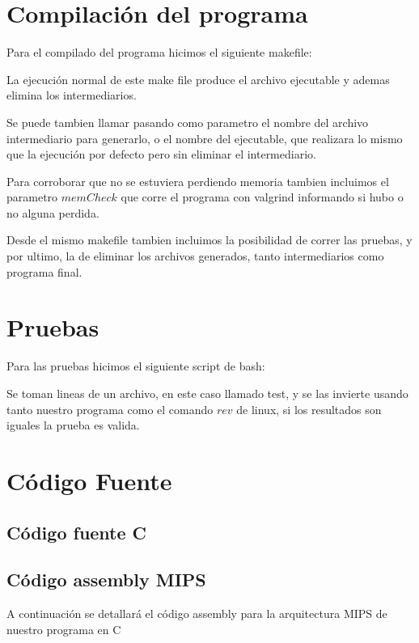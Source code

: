 \documentclass{article}
\begin{document}
\newpage

\section{Compilación del programa}

Para el compilado del programa hicimos el siguiente makefile:



La ejecución normal de este make file produce el archivo ejecutable y ademas elimina los intermediarios.

Se puede tambien llamar pasando como parametro el nombre del archivo intermediario para generarlo, o el nombre del ejecutable, que realizara lo mismo que la ejecución por defecto pero sin eliminar el intermediario.

Para corroborar que no se estuviera perdiendo memoria tambien incluimos el parametro \(memCheck\) que corre el programa con valgrind informando si hubo o no alguna perdida.

Desde el mismo makefile tambien incluimos la posibilidad de correr las pruebas, y por ultimo, la de eliminar los archivos generados, tanto intermediarios como programa final.

\section{Pruebas}

Para las pruebas hicimos el siguiente script de bash:



Se toman lineas de un archivo, en este caso llamado test, y se las invierte usando tanto nuestro programa como el comando \( rev \) de linux, si los resultados son iguales la prueba es valida.

\section{C\'odigo Fuente}

\subsection{C\'odigo fuente C}



\subsection{C\'odigo assembly MIPS}

A continuaci\'on se detallará el c\'odigo assembly para la arquitectura MIPS de nuestro programa en C


\end{document}
